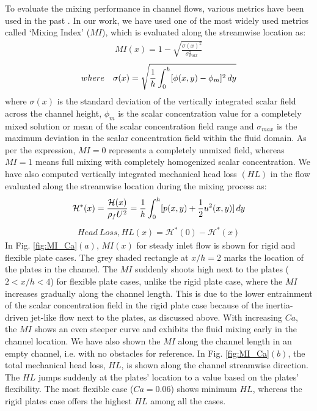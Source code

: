 \documentclass[%
aip,
amsmath,amssymb,
reprint,
]{revtex4-1}
\begin{document}
			To evaluate the mixing performance in channel flows, various metrics have been used in the past \citep{Danckwerts1952,Kockmann2006,Liscinsky1993}. In our work, we have used one of the most widely used metrics called `Mixing Index' ($MI$), which is evaluated along the streamwise location as:
			\begin{eqnarray}
				MI(x)=1-\sqrt{\frac{\sigma(x)^2}{{\sigma^2_{max}}}}
			\end{eqnarray}
			\begin{eqnarray}
				where \quad \sigma(x)=\sqrt{{1\over h} \int_{0}^{h} [\phi(x,y)-\phi_m]^2 \,dy}
			\end{eqnarray}
			where $\sigma(x)$ is the standard deviation of the vertically integrated scalar field across the channel height, $\phi_m$ is the scalar concentration value for a completely mixed solution or mean of the scalar concentration field range and $\sigma_{max}$ is the maximum deviation in the scalar concentration field within the fluid domain. As per the expression, $MI=0$ represents a completely unmixed field, whereas $MI=1$ means full mixing with completely homogenized scalar concentration. We have also computed vertically integrated mechanical head loss $(HL)$ in the flow evaluated along the streamwise location during the mixing process as:
			\begin{eqnarray}
				\mathcal{H}^*(x)=\frac{\mathcal{H}(x)}{\rho_f U^2}=\frac{1}{h}\int_{0}^{h}[p(x,y)+{1\over2}  u^2(x,y)]\,dy
			\end{eqnarray}
			\begin{eqnarray}
				Head \: Loss, HL(x) = \mathcal{H}^*(0)-\mathcal{H}^*(x)
			\end{eqnarray}
			In Fig. \ref{fig:MI_Ca}$(a)$, $MI(x)$ for steady inlet flow is shown for rigid and flexible plate cases. The grey shaded rectangle at $x/h=2$ marks the location of the plates in the channel. The $MI$ suddenly shoots high next to the plates ($2<x/h<4$) for flexible plate cases, unlike the rigid plate case, where the $MI$ increases gradually along the channel length. This is due to the lower entrainment of the scalar concentration field in the rigid plate case because of the inertia-driven jet-like flow next to the plates, as discussed above. With increasing $Ca$, the $MI$ shows an even steeper curve and exhibits the fluid mixing early in the channel location. We have also shown the $MI$ along the channel length in an empty channel, i.e. with no obstacles for reference. In Fig. \ref{fig:MI_Ca}$(b)$, the total mechanical head loss, $HL$, is shown along the channel streamwise direction. The $HL$ jumps suddenly at the plates' location to a value based on the plates' flexibility. The most flexible case ($Ca=0.06$) shows minimum $HL$, whereas the rigid plates case offers the highest $HL$ among all the cases.
			
\end{document}
